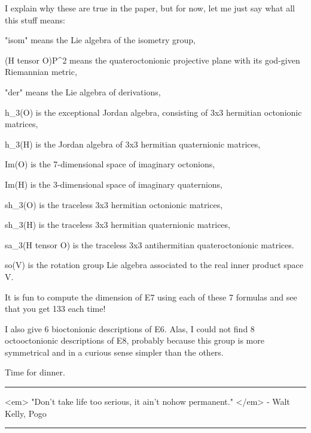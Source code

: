 I explain why these are true in the paper, but for now, let me
just say what all this stuff means:

"isom" means the Lie algebra of the isometry group, 

(H tensor O)P^{2} means the quateroctonionic projective plane
with its god-given Riemannian metric, 

"der" means the Lie algebra of derivations,

h_{3}(O) is the exceptional Jordan algebra, consisting of 3x3 
hermitian octonionic matrices,

h_{3}(H) is the Jordan algebra of 3x3 hermitian quaternionic
matrices,

Im(O) is the 7-dimensional space of imaginary octonions,

Im(H) is the 3-dimensional space of imaginary quaternions,

sh_{3}(O) is the traceless 3x3 hermitian octonionic matrices,

sh_{3}(H) is the traceless 3x3 hermitian quaternionic matrices,

sa_{3}(H tensor O) is the traceless 3x3 antihermitian quateroctonionic
matrices.

so(V) is the rotation group Lie algebra associated to the 
real inner product space V.

It is fun to compute the dimension of E7 using each of these
7 formulas and see that you get 133 each time!  

I also give 6 bioctonionic descriptions of E6.  Alas, I could
not find 8 octooctonionic descriptions of E8, probably because
this group is more symmetrical and in a curious sense simpler 
than the others.

Time for dinner.



 \par\noindent\rule{\textwidth}{0.4pt}
<em> "Don't take life too serious, it ain't nohow permanent."
</em> - Walt Kelly, Pogo

\par\noindent\rule{\textwidth}{0.4pt}

